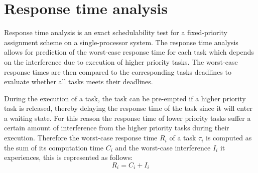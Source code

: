 \section{Response time analysis}
Response time analysis is an exact schedulability test for a fixed-priority assignment scheme on a single-processor system. 
The response time analysis allows for prediction of the worst-case response time for each task which depends on the interference due to execution of higher priority tasks. 
The worst-case response times are then compared to the corresponding tasks deadlines to evaluate whether all tasks meets their deadlines. 

During the execution of a task, the task can be pre-empted if a higher priority task is released, thereby delaying the response time of the task since it will enter a waiting state. 
For this reason the response time of lower priority tasks suffer a certain amount of interference from the higher priority tasks during their execution. 
Therefore the worst-case response time $R_i$ of a task $\tau_i$ is computed as the sum of its computation time $C_i$ and the worst-case interference $I_i$ it experiences, this is represented as follows:
\begin{equation}\label{eq:responsetime}
R_i = C_i + I_i
\end{equation}

